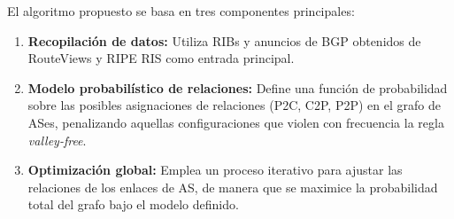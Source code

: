 El algoritmo propuesto se basa en tres componentes principales:
\begin{enumerate}
    \item \textbf{Recopilación de datos:} Utiliza RIBs y anuncios de BGP obtenidos de RouteViews y RIPE RIS como entrada principal.
    \item \textbf{Modelo probabilístico de relaciones:} Define una función de probabilidad sobre las posibles asignaciones de relaciones (P2C, C2P, P2P) en el grafo de ASes, penalizando aquellas configuraciones que violen con frecuencia la regla \textit{valley-free}.
    \item \textbf{Optimización global:} Emplea un proceso iterativo para ajustar las relaciones de los enlaces de AS, de manera que se maximice la probabilidad total del grafo bajo el modelo definido.
\end{enumerate}


    




